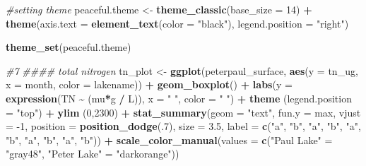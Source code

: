 \documentclass[
]{article}
\newenvironment{Shaded}{\begin{snugshade}}{\end{snugshade}}
\newcommand{\CommentTok}[1]{\textcolor[rgb]{0.56,0.35,0.01}{\textit{#1}}}
\newcommand{\DataTypeTok}[1]{\textcolor[rgb]{0.13,0.29,0.53}{#1}}
\newcommand{\DecValTok}[1]{\textcolor[rgb]{0.00,0.00,0.81}{#1}}
\newcommand{\FloatTok}[1]{\textcolor[rgb]{0.00,0.00,0.81}{#1}}
\newcommand{\KeywordTok}[1]{\textcolor[rgb]{0.13,0.29,0.53}{\textbf{#1}}}
\newcommand{\NormalTok}[1]{#1}
\newcommand{\OperatorTok}[1]{\textcolor[rgb]{0.81,0.36,0.00}{\textbf{#1}}}
\newcommand{\StringTok}[1]{\textcolor[rgb]{0.31,0.60,0.02}{#1}}
\begin{document}
\begin{Shaded}
\begin{Highlighting}[]
\CommentTok{\#setting theme}
\NormalTok{peaceful.theme <{-}}\StringTok{ }\KeywordTok{theme\_classic}\NormalTok{(}\DataTypeTok{base\_size =} \DecValTok{14}\NormalTok{) }\OperatorTok{+}
\StringTok{  }\KeywordTok{theme}\NormalTok{(}\DataTypeTok{axis.text =} \KeywordTok{element\_text}\NormalTok{(}\DataTypeTok{color =} \StringTok{"black"}\NormalTok{), }
        \DataTypeTok{legend.position =} \StringTok{"right"}\NormalTok{)}

\KeywordTok{theme\_set}\NormalTok{(peaceful.theme)}

\CommentTok{\#7}
\CommentTok{\#\#\#\# total nitrogen}
\NormalTok{tn\_plot <{-}}\StringTok{ }\KeywordTok{ggplot}\NormalTok{(peterpaul\_surface, }\KeywordTok{aes}\NormalTok{(}\DataTypeTok{y =}\NormalTok{ tn\_ug, }\DataTypeTok{x =}\NormalTok{ month, }\DataTypeTok{color =}\NormalTok{ lakename)) }\OperatorTok{+}
\StringTok{  }\KeywordTok{geom\_boxplot}\NormalTok{() }\OperatorTok{+}\StringTok{ }
\StringTok{  }\KeywordTok{labs}\NormalTok{(}\DataTypeTok{y =} \KeywordTok{expression}\NormalTok{(TN }\OperatorTok{\textasciitilde{}}\StringTok{ }\NormalTok{(mu}\OperatorTok{*}\NormalTok{g }\OperatorTok{/}\StringTok{ }\NormalTok{L)), }\DataTypeTok{x =} \StringTok{" "}\NormalTok{, }\DataTypeTok{color =} \StringTok{" "}\NormalTok{) }\OperatorTok{+}
\StringTok{  }\KeywordTok{theme}\NormalTok{ (}\DataTypeTok{legend.position =} \StringTok{"top"}\NormalTok{) }\OperatorTok{+}\StringTok{ }\KeywordTok{ylim}\NormalTok{ (}\DecValTok{0}\NormalTok{,}\DecValTok{2300}\NormalTok{) }\OperatorTok{+}
\StringTok{  }\KeywordTok{stat\_summary}\NormalTok{(}\DataTypeTok{geom =} \StringTok{"text"}\NormalTok{, }\DataTypeTok{fun.y =}\NormalTok{ max, }\DataTypeTok{vjust =} \DecValTok{{-}1}\NormalTok{, }
               \DataTypeTok{position =} \KeywordTok{position\_dodge}\NormalTok{(.}\DecValTok{7}\NormalTok{),  }\DataTypeTok{size =} \FloatTok{3.5}\NormalTok{,}
               \DataTypeTok{label =} \KeywordTok{c}\NormalTok{(}\StringTok{"a"}\NormalTok{, }\StringTok{"b"}\NormalTok{, }\StringTok{"a"}\NormalTok{, }\StringTok{"b"}\NormalTok{, }\StringTok{"a"}\NormalTok{, }\StringTok{"b"}\NormalTok{, }
                         \StringTok{"a"}\NormalTok{, }\StringTok{"b"}\NormalTok{, }\StringTok{"a"}\NormalTok{, }\StringTok{"b"}\NormalTok{)) }\OperatorTok{+}
\StringTok{  }\KeywordTok{scale\_color\_manual}\NormalTok{(}\DataTypeTok{values =} \KeywordTok{c}\NormalTok{(}\StringTok{"Paul Lake"}\NormalTok{ =}\StringTok{ "gray48"}\NormalTok{, }\StringTok{"Peter Lake"}\NormalTok{ =}\StringTok{ "darkorange"}\NormalTok{))}


\end{Highlighting}
\end{Shaded}
\end{document}
